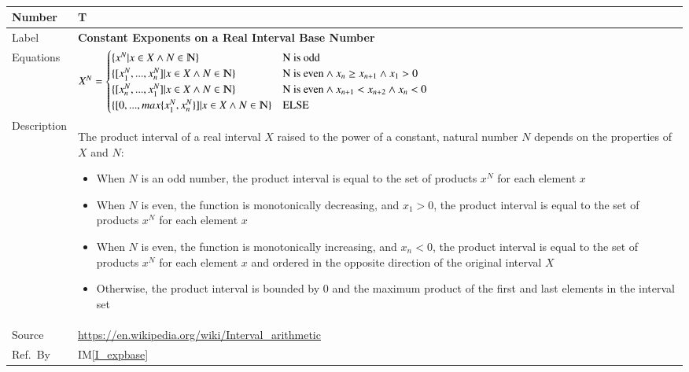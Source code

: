 \documentclass[12pt]{article}
\newcommand{\colAwidth}{0.13\textwidth}
\newcommand{\colBwidth}{0.82\textwidth}
\newcounter{theorynum} %
\newcommand{\iref}[1]{IM\ref{#1}}
\begin{document}
~\newline

\noindent
\begin{minipage}{\textwidth}
	\renewcommand*{\arraystretch}{1.5}
	\begin{tabular}{| p{\colAwidth} | p{\colBwidth}|}
		\hline
		\rowcolor[gray]{0.9}
		Number& T{theorynum}\thetheorynum 
		\label{T_expbase}\\
		\hline
		Label&\bf Constant Exponents on a Real Interval Base 
		Number\\
		\hline
		Equations &  $X^N = \begin{cases}
			\{x^N | x \in X \wedge N 
			\in \varmathbb{N}\} & \text{N is odd}\\
			\{[x_{1}^N,...,x_{n}^N] | x \in X \wedge N 
			\in \varmathbb{N}\} & \text{N is even}\wedge x_{n} \geq x_{n+1} 
			\wedge x_{1} > 0\\
			\{[x_{n}^N,...,x_{1}^N] | x \in X \wedge N 
			\in \varmathbb{N}\} & \text{N is even} \wedge x_{n+1} < x_{n+2} 
			\wedge x_{n} < 0\\
			\{[0,...,max\{x_{1}^N,x_{n}^N\}] | x \in X \wedge N 
			\in \varmathbb{N}\} & \text{ELSE}\\
		\end{cases}$
		\newline
		\\
		\hline
		Description & The product interval of a real interval $X$ 
		raised to the power of a constant, natural number $N$ depends on the 
		properties of $X$ and $N$:
		\begin{itemize}
			\item When $N$ is an odd number, the product interval is equal to 
			the set of products $x^N$ for each element $x$
			\item When $N$ is even, the function is monotonically decreasing, 
			and $x_{1} > 0$, the product interval is equal to the set of 
			products $x^N$ for each element $x$
			\item When $N$ is even, the function is monotonically increasing, 
			and $x_{n} < 0$, the product interval is equal to the set of 
			products $x^N$ for each element $x$ and ordered in the opposite 
			direction of the original interval $X$
			\item Otherwise, the product interval is bounded by $0$ and the 
			maximum product of the first and last elements in the interval set
		\end{itemize}\\
		\hline
		Source & \url{https://en.wikipedia.org/wiki/Interval_arithmetic}\\
		\hline
		Ref.\ By & \iref{I_expbase}\\
		\hline
	\end{tabular}
\end{minipage}\\
\end{document}

